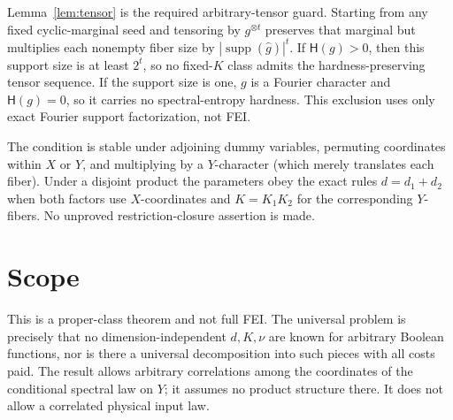 \documentclass[11pt]{article}
\newcommand{\HH}{\mathsf H}
\newcommand{\wh}[1]{\widehat{#1}}
\begin{document}
Lemma~\ref{lem:tensor} is the required arbitrary-tensor guard.  Starting from any
fixed cyclic-marginal seed and tensoring by $g^{\otimes t}$ preserves that marginal
but multiplies each nonempty fiber size by
$|\operatorname{supp}(\wh g)|^t$.  If $\HH(g)>0$, then this support size is at least
$2^t$, so no fixed-$K$ class admits the hardness-preserving tensor sequence.  If the
support size is one, $g$ is a Fourier character and $\HH(g)=0$, so it carries no
spectral-entropy hardness.  This exclusion uses only exact Fourier support
factorization, not FEI.

The condition is stable under adjoining dummy variables, permuting coordinates
within $X$ or $Y$, and multiplying by a $Y$-character (which merely translates each
fiber).  Under a disjoint product the parameters obey the exact rules
$d=d_1+d_2$ when both factors use $X$-coordinates and $K=K_1K_2$ for the corresponding
$Y$-fibers.  No unproved restriction-closure assertion is made.

\section*{Scope}
This is a proper-class theorem and not full FEI.  The universal problem is precisely
that no dimension-independent $d,K,\nu$ are known for arbitrary Boolean functions,
nor is there a universal decomposition into such pieces with all costs paid.  The
result allows arbitrary correlations among the coordinates of the conditional
spectral law on $Y$; it assumes no product structure there.  It does not allow a
correlated physical input law.
\end{document}
